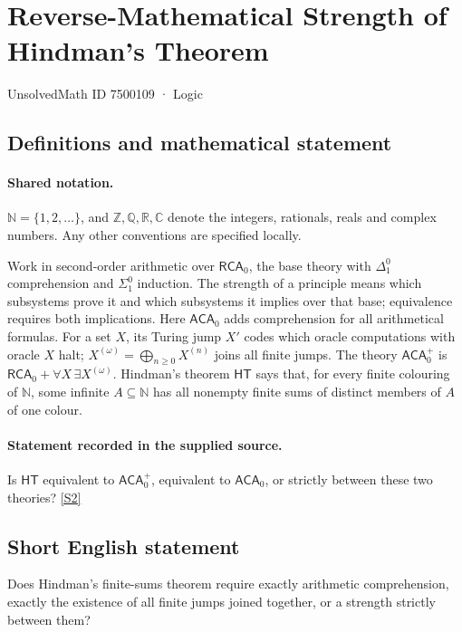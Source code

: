 \documentclass[11pt]{article}
\newcommand{\sref}[2]{\hyperlink{source:#1:#2}{[S#2]}}
\begin{document}
\setcounter{section}{7500108}
\section{Reverse-Mathematical Strength of Hindman's Theorem}\label{7500109}
{\small\sffamily UnsolvedMath ID 7500109 · Logic}
\subsection{Definitions and mathematical statement}

\paragraph{Shared notation.}$\mathbb N=\{1,2,\ldots\}$, and $\mathbb Z,\mathbb Q,\mathbb R,\mathbb C$ denote the integers, rationals, reals and complex numbers. Any other conventions are specified locally.


Work in second-order arithmetic over $\mathsf{RCA}_0$, the base theory with $\Delta^0_1$ comprehension and $\Sigma^0_1$ induction. The strength of a principle means which subsystems prove it and which subsystems it implies over that base; equivalence requires both implications.  Here $\mathsf{ACA}_0$ adds comprehension for all arithmetical formulas. For a set $X$, its Turing jump $X'$ codes which oracle computations with oracle $X$ halt; $X^{(\omega)}=\bigoplus_{n\geq0}X^{(n)}$ joins all finite jumps. The theory $\mathsf{ACA}_0^+$ is $\mathsf{RCA}_0+\forall X\,\exists X^{(\omega)}$. Hindman’s theorem $\mathsf{HT}$ says that, for every finite colouring of $\mathbb N$, some infinite $A\subseteq\mathbb N$ has all nonempty finite sums of distinct members of $A$ of one colour.
\paragraph{Statement recorded in the supplied source.}
Is $\mathsf{HT}$ equivalent to $\mathsf{ACA}_0^+$, equivalent to $\mathsf{ACA}_0$, or strictly between these two theories? \sref{7500109}{2}
\subsection{Short English statement}
Does Hindman’s finite-sums theorem require exactly arithmetic comprehension, exactly the existence of all finite jumps joined together, or a strength strictly between them?
\end{document}
